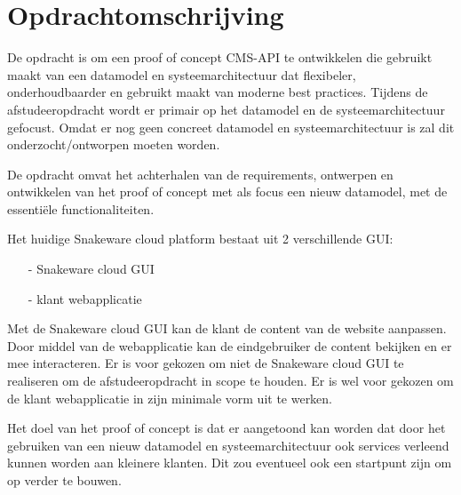 \section{Opdrachtomschrijving}
\label{sec:Opdrachtomschrijving}
De opdracht is om een proof of concept CMS-API te ontwikkelen die gebruikt maakt van een datamodel en systeemarchitectuur dat flexibeler, onderhoudbaarder en gebruikt maakt van moderne best practices.
Tijdens de afstudeeropdracht wordt er primair op het datamodel en de systeemarchitectuur gefocust.
Omdat er nog geen concreet datamodel en systeemarchitectuur is zal dit onderzocht/ontworpen moeten worden.

\whitespace[2]
De opdracht omvat het achterhalen van de requirements, ontwerpen en ontwikkelen van het proof of concept met als focus een nieuw datamodel, met de essentiële functionaliteiten.

\whitespace[2]
Het huidige Snakeware cloud platform bestaat uit 2 verschillende \gls{GUI}:
\begin{itemize}
	\item[-] Snakeware cloud \gls{GUI}
	\item[-] klant webapplicatie
\end{itemize}

\whitespace
Met de Snakeware cloud \gls{GUI} kan de klant de content van de website aanpassen.
Door middel van de webapplicatie kan de eindgebruiker de content bekijken en er mee interacteren.
Er is voor gekozen om niet de Snakeware cloud \gls{GUI} te realiseren om de afstudeeropdracht in scope te houden.
Er is wel voor gekozen om de klant webapplicatie in zijn minimale vorm uit te werken.

\whitespace[2]
Het doel van het proof of concept is dat er aangetoond kan worden dat door het gebruiken van een nieuw datamodel en systeemarchitectuur ook services verleend kunnen worden aan kleinere klanten.
Dit zou eventueel ook een startpunt zijn om op verder te bouwen.
%
%
